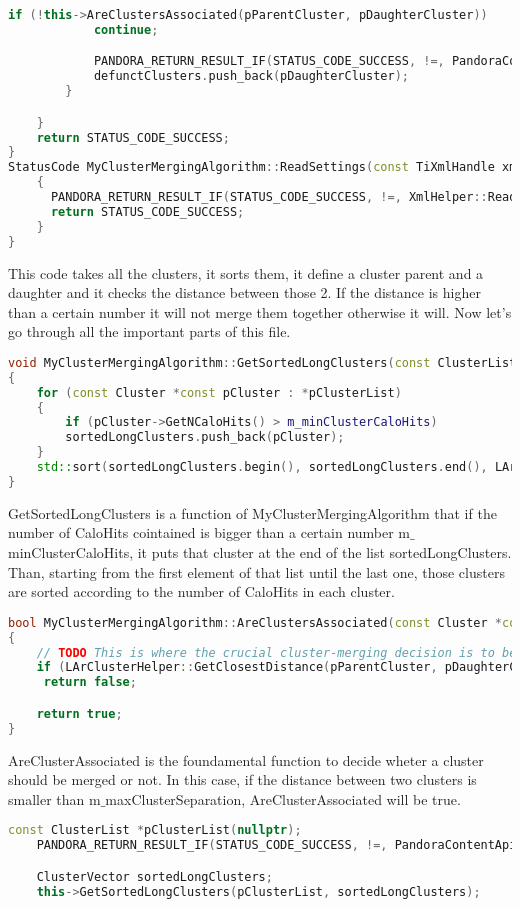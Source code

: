 \begin{lstlisting}[language=C++,caption=MyClusterMergingAlgorithm.cc]
			if (!this->AreClustersAssociated(pParentCluster, pDaughterCluster))
			continue;

			PANDORA_RETURN_RESULT_IF(STATUS_CODE_SUCCESS, !=, PandoraContentApi::MergeAndDeleteClusters(*this, pParentCluster, pDaughterCluster));
			defunctClusters.push_back(pDaughterCluster);
		}

	}
	return STATUS_CODE_SUCCESS;
}
StatusCode MyClusterMergingAlgorithm::ReadSettings(const TiXmlHandle xmlHandle)
	{
	  PANDORA_RETURN_RESULT_IF(STATUS_CODE_SUCCESS, !=, XmlHelper::ReadValue(xmlHandle, "InputClusterListName", m_inputClusterListName));
	  return STATUS_CODE_SUCCESS;
	}
}
\end{lstlisting}
This code takes all the clusters, it sorts them, it define a cluster parent and a daughter and it checks the distance between those 2. If the distance is higher than a certain number it will not merge them together otherwise it will. Now let's go through all the important parts of this file.

\begin{lstlisting}[language=C++]
void MyClusterMergingAlgorithm::GetSortedLongClusters(const ClusterList *const pClusterList, ClusterVector &sortedLongClusters) const
{
	for (const Cluster *const pCluster : *pClusterList)
	{
		if (pCluster->GetNCaloHits() > m_minClusterCaloHits)
		sortedLongClusters.push_back(pCluster);
	}
	std::sort(sortedLongClusters.begin(), sortedLongClusters.end(), LArClusterHelper::SortByNHits);
}
\end{lstlisting}
GetSortedLongClusters is a function of MyClusterMergingAlgorithm that if the number of CaloHits cointained is bigger than a certain number m${\_}$minClusterCaloHits, it puts that cluster at the end of the list sortedLongClusters. Than, starting from the first element of that list until the last one, those clusters are sorted according to the number of CaloHits in each cluster.
\begin{lstlisting}[language=C++]
bool MyClusterMergingAlgorithm::AreClustersAssociated(const Cluster *const pParentCluster, const Cluster *const pDaughterCluster) const
{
	// TODO This is where the crucial cluster-merging decision is to be made - add sophistication here!
	if (LArClusterHelper::GetClosestDistance(pParentCluster, pDaughterCluster) > m_maxClusterSeparation)
	 return false;

	return true;
}
\end{lstlisting}
AreClusterAssociated is the foundamental function to decide wheter a cluster should be merged or not. In this case, if the distance between two clusters is smaller than m${\_}$maxClusterSeparation, AreClusterAssociated will be true.
\begin{lstlisting}[language=C++]
	const ClusterList *pClusterList(nullptr);
	PANDORA_RETURN_RESULT_IF(STATUS_CODE_SUCCESS, !=, PandoraContentApi::GetList(*this, m_inputClusterListName, pClusterList));

	ClusterVector sortedLongClusters;
	this->GetSortedLongClusters(pClusterList, sortedLongClusters);

\end{lstlisting}

